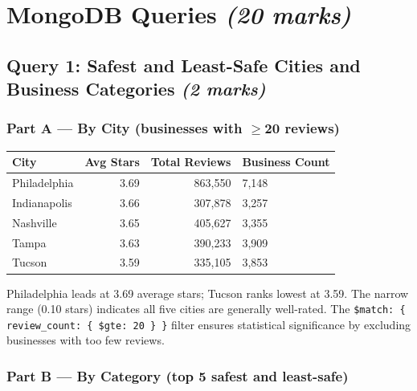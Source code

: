 \documentclass[12pt,a4paper]{article}
\newcommand{\code}[1]{\texttt{#1}}
\newcommand{\marks}[1]{\hfill\textit{(#1 marks)}}
\begin{document}
\section{MongoDB Queries \marks{20}}

\subsection{Query 1: Safest and Least-Safe Cities and Business Categories \marks{2}}

\subsubsection*{Part A --- By City (businesses with $\geq$20 reviews)}

\begin{table}[H]
  \centering
  \begin{tabular}{lrrl}
    \toprule
    \textbf{City} & \textbf{Avg Stars} & \textbf{Total Reviews} & \textbf{Business Count} \\
    \midrule
    Philadelphia  & 3.69 & 863,550 & 7,148 \\
    Indianapolis  & 3.66 & 307,878 & 3,257 \\
    Nashville     & 3.65 & 405,627 & 3,355 \\
    Tampa         & 3.63 & 390,233 & 3,909 \\
    Tucson        & 3.59 & 335,105 & 3,853 \\
    \bottomrule
  \end{tabular}
\end{table}

Philadelphia leads at 3.69 average stars; Tucson ranks lowest at 3.59. The
narrow range (0.10 stars) indicates all five cities are generally well-rated.
The \code{\$match: \{ review\_count: \{ \$gte: 20 \} \}} filter ensures
statistical significance by excluding businesses with too few reviews.

\subsubsection*{Part B --- By Category (top 5 safest and least-safe)}
\end{document}
